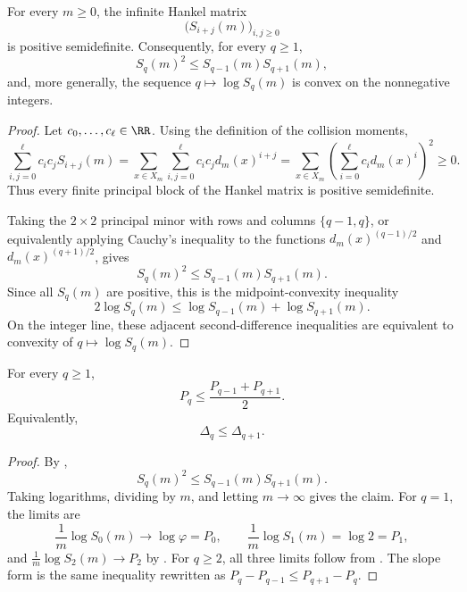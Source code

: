 \begin{proposition}
\label{prop:hankel-psd}
For every \(m\ge0\), the infinite Hankel matrix
\[
  \bigl(S_{i+j}(m)\bigr)_{i,j\ge0}
\]
is positive semidefinite.  Consequently, for every \(q\ge1\),
\[
  S_q(m)^2\le S_{q-1}(m)S_{q+1}(m),
\]
and, more generally, the sequence \(q\mapsto \log S_q(m)\) is convex on the
nonnegative integers.
\end{proposition}

\begin{proof}
Let \(c_0,\dots,c_\ell\in\RR\).  Using the definition of the collision
moments,
\[
  \sum_{i,j=0}^{\ell}c_i c_j S_{i+j}(m)
  =
  \sum_{x\in X_m}\sum_{i,j=0}^{\ell}c_i c_j d_m(x)^{i+j}
  =
  \sum_{x\in X_m}\left(\sum_{i=0}^{\ell}c_i d_m(x)^i\right)^2
  \ge0.
\]
Thus every finite principal block of the Hankel matrix is positive
semidefinite.

Taking the \(2\times2\) principal minor with rows and columns
\(\{q-1,q\}\), or equivalently applying Cauchy's inequality to the functions
\(d_m(x)^{(q-1)/2}\) and \(d_m(x)^{(q+1)/2}\), gives
\[
  S_q(m)^2\le S_{q-1}(m)S_{q+1}(m).
\]
Since all \(S_q(m)\) are positive, this is the midpoint-convexity inequality
\[
  2\log S_q(m)\le \log S_{q-1}(m)+\log S_{q+1}(m).
\]
On the integer line, these adjacent second-difference inequalities are
equivalent to convexity of \(q\mapsto\log S_q(m)\).
\end{proof}

\begin{corollary}
\label{cor:cross-q-logconvex}
For every \(q\ge1\),
\[
  P_q\le \frac{P_{q-1}+P_{q+1}}2.
\]
Equivalently,
\[
  \Delta_q\le \Delta_{q+1}.
\]
\end{corollary}

\begin{proof}
By ,
\[
  S_q(m)^2\le S_{q-1}(m)S_{q+1}(m).
\]
Taking logarithms, dividing by \(m\), and letting \(m\to\infty\) gives the
claim.  For \(q=1\), the limits are
\[
  \frac1m\log S_0(m)\to\log\varphi=P_0,\qquad
  \frac1m\log S_1(m)=\log2=P_1,
\]
and \(\frac1m\log S_2(m)\to P_2\) by .  For
\(q\ge2\), all three limits follow from .  The slope
form is the same inequality rewritten as
\(P_q-P_{q-1}\le P_{q+1}-P_q\).
\end{proof}
